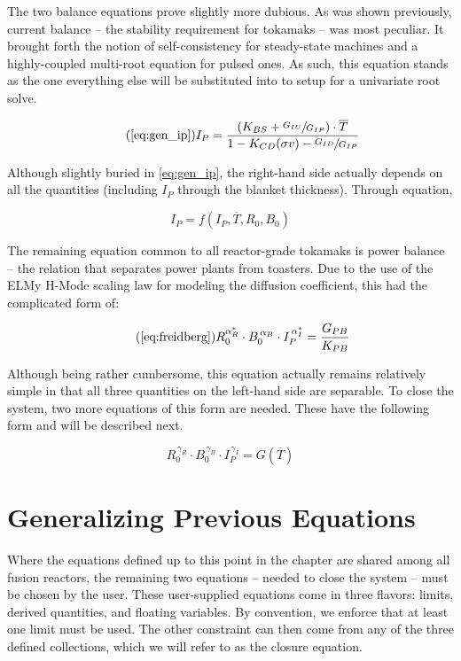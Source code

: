 The two balance equations prove slightly more dubious. As was shown previously, current balance -- the stability requirement for tokamaks -- was most peculiar. It brought forth the notion of self-consistency for steady-state machines and a highly-coupled multi-root equation for pulsed ones. As such, this equation stands as the one everything else will be substituted into to setup for a univariate root solve.

\begin{equation}
	\tag{\ref{eq:gen_ip}}
	I_P = \frac{ \left( K_{BS} + \sfrac{ G_{IU} }{ G_{IP} } \right) \cdot \overline T }{ 1 - K_{CD} ( \sigma v ) - \sfrac{ G_{ID} }{ G_{IP} } }
\end{equation}

Although slightly buried in \cref{eq:gen_ip}, the right-hand side actually depends on all the quantities (including $I_P$ through the blanket thickness). Through equation,

\begin{equation}
	I_P = f(I_P, \overline T, R_0, B_0)
\end{equation}

The remaining equation common to all reactor-grade tokamaks is power balance -- the relation that separates power plants from toasters. Due to the use of the ELMy H-Mode scaling law for modeling the diffusion coefficient, this had the complicated form of:

\begin{equation}
	\tag{\ref{eq:freidberg}}
	R_0^{ \alpha_R^* } \cdot B_0^{\,\alpha_B} \cdot I_P^{\,\alpha_I^*} = \frac{ G_{PB} }{ K_{PB} }
\end{equation}

Although being rather cumbersome, this equation actually remains relatively simple in that all three quantities on the left-hand side are separable. To close the system, two more equations of this form are needed. These have the following form and will be described next.

\begin{equation}
	\label{eq:rbi}
	R_0^{\, \gamma_R} \cdot B_0^{\, \gamma_B} \cdot I_P^{\, \gamma_I} = G( \overline T )
\end{equation}

\section{Generalizing Previous Equations}

Where the equations defined up to this point in the chapter are shared among all fusion reactors, the remaining two equations -- needed to close the system -- must be chosen by the user. These user-supplied equations come in three flavors: limits, derived quantities, and floating variables. By convention, we enforce that at least one limit must be used. The other constraint can then come from any of the three defined collections, which we will refer to as the closure equation.


